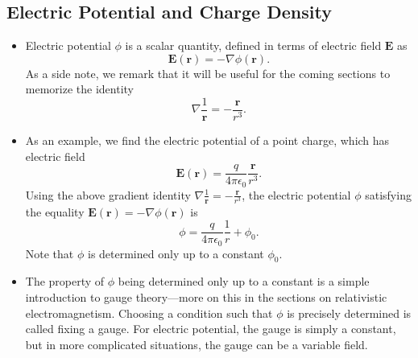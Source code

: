 \documentclass[11pt, a4paper]{article}
\renewcommand{\vec}[1]{\bm{#1}} %
\renewcommand{\r}{\vec{r}}
\newcommand{\E}{\vec{E}} %
\newcommand{\ee}{\epsilon_{0}}  %
\renewcommand{\grad}{\nabla}
\begin{document}
\subsection{Electric Potential and Charge Density}
\begin{itemize}
	\item Electric potential $ \phi $ is a scalar quantity, defined in terms of electric field $ \E $ as
	\begin{equation*}
		\E(\r) = - \grad \phi(\r).
	\end{equation*}
	As a side note, we remark that it will be useful for the coming sections to memorize the identity
	\begin{equation*}
		\grad \frac{1}{\r} = - \frac{\r}{r^{3}}.
	\end{equation*}
	
	\item As an example, we find the electric potential of a point charge, which has electric field
	\begin{equation*}
		\E(\r) = \frac{q}{4\pi \ee} \frac{\r}{r^{3}}.
	\end{equation*}
    Using the above gradient identity $ \grad \frac{1}{\r} = - \frac{\r}{r^{3}} $, the electric potential $ \phi $  satisfying the equality $ \E(\r) = -\grad \phi(\r) $ is
	\begin{equation*}
		\phi = \frac{q}{4\pi \ee}\frac{1}{r} + \phi_{0}.
	\end{equation*}
	Note that $ \phi $ is determined only up to a constant $ \phi_{0} $.
	
	\item The property of $ \phi $ being determined only up to a constant is a simple introduction to gauge theory---more on this in the sections on relativistic electromagnetism. Choosing a condition such that $ \phi $ is precisely determined is called fixing a gauge. For electric potential, the gauge is simply a constant, but in more complicated situations, the gauge can be a variable field.
	
\end{itemize}
\end{document}
